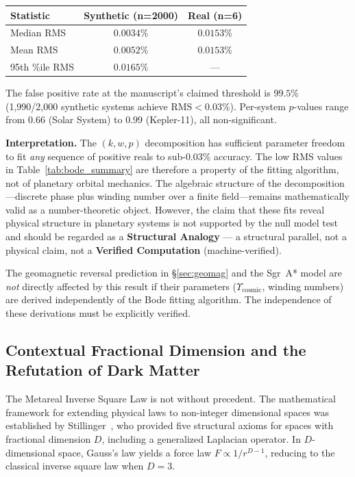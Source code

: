 \begin{center}
\begin{tabular}{lcc}
\toprule
\textbf{Statistic} & \textbf{Synthetic (n=2000)} & \textbf{Real (n=6)} \\
\midrule
Median RMS & $0.0034\%$ & $0.0153\%$ \\
Mean RMS & $0.0052\%$ & $0.0153\%$ \\
95th \%ile RMS & $0.0165\%$ & --- \\
\bottomrule
\end{tabular}
\end{center}

The false positive rate at the manuscript's claimed threshold is $99.5\%$ (1,990/2,000 synthetic systems achieve $\mathrm{RMS} < 0.03\%$). Per-system $p$-values range from $0.66$ (Solar System) to $0.99$ (Kepler-11), all non-significant.

\textbf{Interpretation.} The $(k, w, p)$ decomposition has sufficient parameter freedom to fit \emph{any} sequence of positive reals to sub-$0.03\%$ accuracy. The low RMS values in Table~\ref{tab:bode_summary} are therefore a property of the fitting algorithm, not of planetary orbital mechanics. The algebraic structure of the decomposition---discrete phase plus winding number over a finite field---remains mathematically valid as a number-theoretic object. However, the claim that these fits reveal physical structure in planetary systems is not supported by the null model test and should be regarded as a \textbf{Structural Analogy} --- a structural parallel, not a physical claim, not a \textbf{Verified Computation} (machine-verified).

The geomagnetic reversal prediction in \S\ref{sec:geomag} and the Sgr~A* model are \emph{not} directly affected by this result if their parameters ($\Upsilon_{\mathrm{cosmic}}$, winding numbers) are derived independently of the Bode fitting algorithm. The independence of these derivations must be explicitly verified.

\subsection{Contextual Fractional Dimension and the Refutation of Dark Matter}
The Metareal Inverse Square Law is not without precedent. The mathematical framework for extending physical laws to non-integer dimensional spaces was established by Stillinger~\cite{stillinger1977}, who provided five structural axioms for spaces with fractional dimension $D$, including a generalized Laplacian operator. In $D$-dimensional space, Gauss's law yields a force law $F \propto 1/r^{D-1}$, reducing to the classical inverse square law when $D = 3$.

